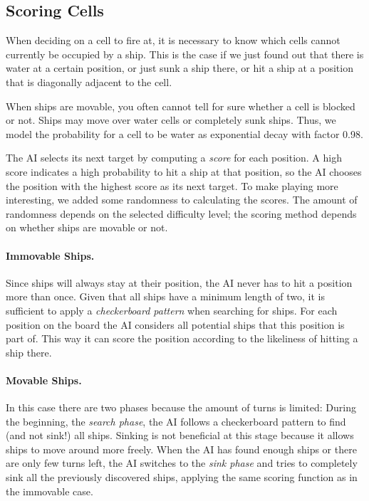 \documentclass[a4paper]{easychair}
\begin{document}
\subsection{Scoring Cells}
When deciding on a cell to fire at, it is necessary to know which cells cannot currently be occupied by a ship. This is the case if we just found out that there is water at a certain position, or just sunk a ship there, or hit a ship at a position that is diagonally adjacent to the cell. 

When ships are movable, you often cannot tell for sure whether a cell is blocked or not. Ships may move over water cells or completely sunk ships. Thus, we model the probability for a cell to be water as exponential decay with factor 0.98.

The AI selects its next target by computing a \emph{score} for each position. A high score indicates a high probability to hit a ship at that position, so the AI chooses the position with the highest score as its next target. To make playing more interesting, we added some randomness to calculating the scores. The amount of randomness depends on the selected difficulty level; the scoring method depends on whether ships are movable or not.

\paragraph{Immovable Ships.} Since ships will always stay at their position, the AI never has to hit a position more than once. Given that all ships have a minimum length of two, it is sufficient to apply a \emph{checkerboard pattern} when searching for ships. For each position on the board the AI considers all potential ships that this position is part of. This way it can score the position according to the likeliness of hitting a ship there.

\paragraph{Movable Ships.} In this case there are two phases because the amount of turns is limited: During the beginning, the \emph{search phase}, the AI follows a checkerboard pattern to find (and not sink!) all ships. Sinking is not beneficial at this stage because it allows ships to move around more freely. When the AI has found enough ships or there are only few turns left, the AI switches to the \emph{sink phase} and tries to completely sink all the previously discovered ships, applying the same scoring function as in the immovable case.
\end{document}
